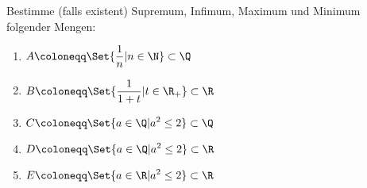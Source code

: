 \begin{exercise}
  Bestimme (falls existent) Supremum, Infimum, Maximum und Minimum folgender
  Mengen:
 \begin{enumerate}
 \item $\displaystyle A \coloneqq \Set{\frac{1}{n} | n \in \N} \subset \Q$
 \item $\displaystyle B \coloneqq \Set{\frac{1}{1 + t} | t \in \R_+} \subset \R$
 \item $\displaystyle C \coloneqq \Set{a \in \Q | a^2 \leq 2} \subset \Q$
 \item $\displaystyle D \coloneqq \Set{a \in \Q | a^2 \leq 2} \subset \R$
 \item $\displaystyle E \coloneqq \Set{a \in \R | a^2 \leq 2} \subset \R$
 \end{enumerate}
\end{exercise}
